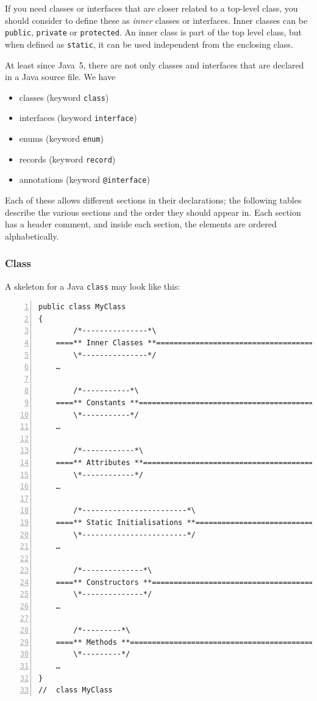 \documentclass[11pt,a4paper, titlepage, parskip=half, headsepline, footsepline, cleardoublepage=current, headheight=1cm]{scrbook}
\begin{document}
If you need classes or interfaces that are closer related to a top-level class, you should consider to define these as \textit{inner} classes or interfaces. Inner classes can be \lstinline|public|, \lstinline|private| or \lstinline|protected|. An inner class is part of the top level class, but when defined as \lstinline|static|, it can be used independent from the enclosing class.

At least since Java~5, there are not only classes and interfaces that are declared in a Java source file. We have

\begin{itemize}[nosep]
\item{classes (keyword \lstinline|class|)}
\item{interfaces (keyword \lstinline|interface|)}
\item{enums (keyword \lstinline|enum|)}
\item{records (keyword \lstinline|record|)}
\item{annotations (keyword \lstinline|@interface|)}
\end{itemize}

Each of these allows different sections in their declarations; the following tables describe the various sections and the order they should appear in. Each section has a header comment, and inside each section, the elements are ordered alphabetically.

\subsubsection{Class}
A skeleton for a Java \lstinline|class| may look like this:

\begin{lstlisting}[numbers=left,caption={Class Skeleton}]
public class MyClass 
{
        /*---------------*\
    ====** Inner Classes **==========================================
        \*---------------*/
    …    
        
        /*-----------*\
    ====** Constants **==============================================
        \*-----------*/
    …
        
        /*------------*\
    ====** Attributes **=============================================
        \*------------*/
    …
            
        /*------------------------*\
    ====** Static Initialisations **=================================
        \*------------------------*/
    …
        
        /*--------------*\
    ====** Constructors **===========================================
        \*--------------*/
    …
        
        /*---------*\
    ====** Methods **================================================
        \*---------*/
    …            
}
//  class MyClass
\end{lstlisting}
 
\end{document}
